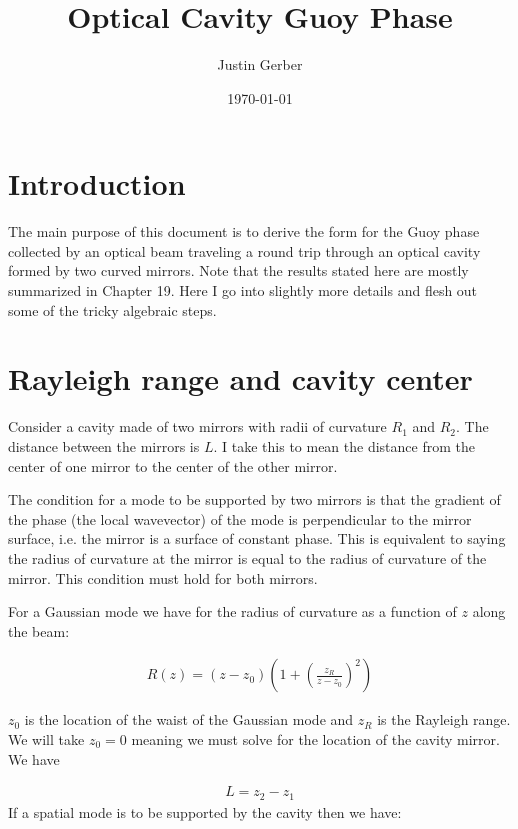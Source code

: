\documentclass[12pt]{article}
\begin{document}
\title{Optical Cavity Guoy Phase}
\author{Justin Gerber}
\date{\today}
\maketitle




\section{Introduction}

The main purpose of this document is to derive the form for the Guoy phase collected by an optical beam traveling a round trip through an optical cavity formed by two curved mirrors.
Note that the results stated here are mostly summarized in \cite{Siegman1986} Chapter 19.
Here I go into slightly more details and flesh out some of the tricky algebraic steps. 


\section{Rayleigh range and cavity center}

Consider a cavity made of two mirrors with radii of curvature $R_1$ and $R_2$. The distance between the mirrors is $L$. I take this to mean the distance from the center of one mirror to the center of the other mirror. 

The condition for a mode to be supported by two mirrors is that the gradient of the phase (the local wavevector) of the mode is perpendicular to the mirror surface, i.e. the mirror is a surface of constant phase. 
This is equivalent to saying the radius of curvature at the mirror is equal to the radius of curvature of the mirror. 
This condition must hold for both mirrors.

For a Gaussian mode we have for the radius of curvature as a function of $z$ along the beam:

\begin{align}
R(z) = (z-z_0)\left(1+\left( \frac{z_R}{z-z_0}\right)^2\right)
\end{align}

$z_0$ is the location of the waist of the Gaussian mode and $z_R$ is the Rayleigh range.
We will take $z_0=0$ meaning we must solve for the location of the cavity mirror.
We have

\begin{align}
L = z_2 - z_1
\end{align}
If a spatial mode is to be supported by the cavity then we have:
\end{document}
